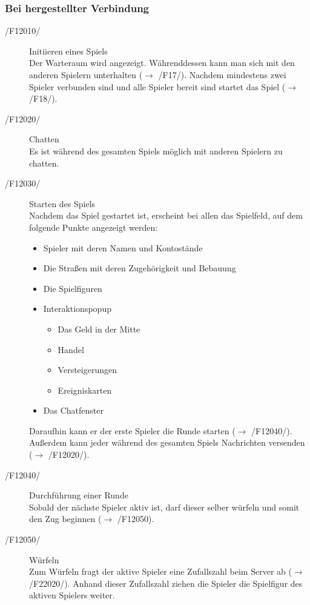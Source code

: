 \documentclass[a4paper,10pt]{article}
\begin{document}
\subsubsection{Bei hergestellter Verbindung}
\begin{description}
\item[/F12010/] Initiieren eines Spiels \\
Der Warteraum wird angezeigt. Währenddessen kann man sich mit den anderen Spielern unterhalten ($\rightarrow$ /F17/). Nachdem mindestens zwei Spieler verbunden sind und alle Spieler bereit sind startet das Spiel ($\rightarrow$ /F18/). 
\item[/F12020/] Chatten \\
Es ist während des gesamten Spiels möglich mit anderen Spielern zu chatten.
\item[/F12030/] Starten des Spiels \\
Nachdem das Spiel gestartet ist, erscheint bei allen das Spielfeld, auf dem folgende Punkte angezeigt werden:
\begin{itemize}
\item Spieler mit deren Namen und Kontostände
\item Die Straßen mit deren Zugehörigkeit und Bebauung
\item Die Spielfiguren
\item Interaktionspopup
\begin{itemize}
\item Das Geld in der Mitte
\item Handel
\item Versteigerungen
\item Ereigniskarten
\end{itemize}
\item Das Chatfenster
\end{itemize}
Daraufhin kann er der erste Spieler die Runde starten ($\rightarrow$ /F12040/). Außerdem kann jeder während des gesamten Spiels Nachrichten versenden ($\rightarrow$ /F12020/).
\item[/F12040/] Durchführung einer Runde \\
Sobald der nächste Spieler aktiv ist, darf dieser selber würfeln und somit den Zug beginnen ($\rightarrow$ /F12050).
\item[/F12050/] Würfeln \\
Zum Würfeln fragt der aktive Spieler eine Zufallszahl beim Server ab ($\rightarrow$ /F22020/). Anhand dieser Zufallszahl ziehen die Spieler die Spielfigur des aktiven Spielers weiter.


\end{description}
\end{document}
